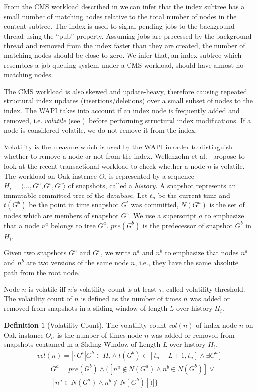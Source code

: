 \documentclass[abstracton,12pt]{scrartcl}
\theoremstyle{definition}
\newtheorem{definition}{Definition}
\begin{document}
From the CMS workload described in  we can 
infer that the index subtree has a small number of
matching nodes relative to the total number of nodes in the content subtree. The index is
 used to signal pending jobs to the background thread using
the ``pub'' property. Assuming jobs are processed by
the background thread and removed from the index faster than they are created,
the number of matching nodes should be close to zero. We infer that, an index subtree
which resembles a job-queuing system under a CMS workload, should have
almost no matching nodes. 

The CMS workload is also skewed and update-heavy, therefore causing repeated structural index
updates (insertions/deletions) over a small subset of nodes to the index.
The WAPI takes into account if an index node is frequently added and removed,
i.e. \textit{volatile} (see ), before performing structural
index modifications. If a node is considered volatile, we do not remove it from the index.

Volatility is the measure which is used by the WAPI in order to distinguish
whether to remove a node or not from the index.
Wellenzohn et al.~\cite{KW17} propose to look at the recent transactional
workload to check whether a node $n$ is volatile. The workload on Oak instance
$O_i$ is represented by a sequence $H_i = \langle \ldots, G^a, G^b, G^c
\rangle$ of snapshots, called a \textit{history}. A snapshot represents an immutable
committed tree of the database. Let $t_n$ be the current time and
$t(G^b)$ be the point in time snapshot $G^b$ was committed, $N(G^a)$ is the
set of nodes which are members of snapshot $G^a$. We use a superscript $a$
to emphasize that a node $n^a$ belongs to tree $G^a$. $pre(G^b)$ is the
predecessor of snapshot $G^b$ in $H_i$.

Given two snapshots $G^a$ and $G^b$, we write $n^a$ and $n^b$ to emphasize that
nodes $n^a$ and $n^b$ are two versions of the same node $n$, i.e., they have
the same absolute path from the root node.

Node $n$ is volatile iff $n$'s volatility count is at least $\tau$, called
volatility threshold. The volatility count of $n$ is defined as the number of
times $n$ was added or removed from snapshots in a sliding window of length
$L$ over history $H_i$.

\begin{definition}[Volatility Count]
  The volatility count $vol(n)$ of index node $n$ on Oak instance $O_i$, is the number of
  times node $n$ was added or removed from snapshots contained in a Sliding
  Window of Length $L$ over history $H_i$.
  \begin{align*}
    vol(n) = | \{ G^b | G^b \in H_i \land t(G^b) \in [t_n-L+1, t_n] \land \exists G^a[ \\
    \qquad G^a = pre(G^b) \land ([n^a \notin N(G^a) \land n^b \in N(G^b)]\lor \\
    \qquad [n^a \in N(G^a) \land n^b \notin N(G^b)] )]\} |
  \end{align*}
  \label{def:vol_count}
\end{definition}
\end{document}
